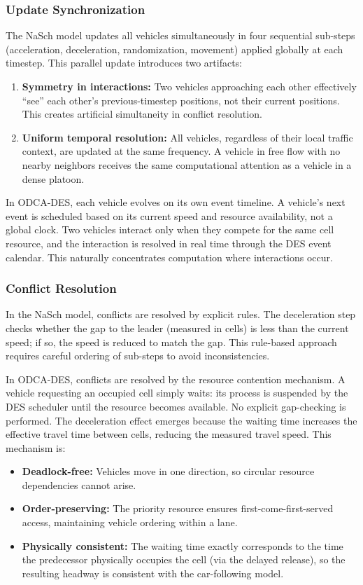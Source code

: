 \documentclass[review,number]{elsarticle} %
\begin{document}
\subsubsection{Update Synchronization}

The NaSch model updates all vehicles simultaneously in four sequential sub-steps (acceleration, deceleration, randomization, movement) applied globally at each timestep. This parallel update introduces two artifacts:
\begin{enumerate}
    \item \textbf{Symmetry in interactions:} Two vehicles approaching each other effectively ``see'' each other's previous-timestep positions, not their current positions. This creates artificial simultaneity in conflict resolution.
    \item \textbf{Uniform temporal resolution:} All vehicles, regardless of their local traffic context, are updated at the same frequency. A vehicle in free flow with no nearby neighbors receives the same computational attention as a vehicle in a dense platoon.
\end{enumerate}

In ODCA-DES, each vehicle evolves on its own event timeline. A vehicle's next event is scheduled based on its current speed and resource availability, not a global clock. Two vehicles interact only when they compete for the same cell resource, and the interaction is resolved in real time through the DES event calendar. This naturally concentrates computation where interactions occur.

\subsubsection{Conflict Resolution}

In the NaSch model, conflicts are resolved by explicit rules. The deceleration step checks whether the gap to the leader (measured in cells) is less than the current speed; if so, the speed is reduced to match the gap. This rule-based approach requires careful ordering of sub-steps to avoid inconsistencies.

In ODCA-DES, conflicts are resolved by the resource contention mechanism. A vehicle requesting an occupied cell simply waits: its process is suspended by the DES scheduler until the resource becomes available. No explicit gap-checking is performed. The deceleration effect emerges because the waiting time increases the effective travel time between cells, reducing the measured travel speed. This mechanism is:
\begin{itemize}
    \item \textbf{Deadlock-free:} Vehicles move in one direction, so circular resource dependencies cannot arise.
    \item \textbf{Order-preserving:} The priority resource ensures first-come-first-served access, maintaining vehicle ordering within a lane.
    \item \textbf{Physically consistent:} The waiting time exactly corresponds to the time the predecessor physically occupies the cell (via the delayed release), so the resulting headway is consistent with the car-following model.
\end{itemize}
\end{document}
